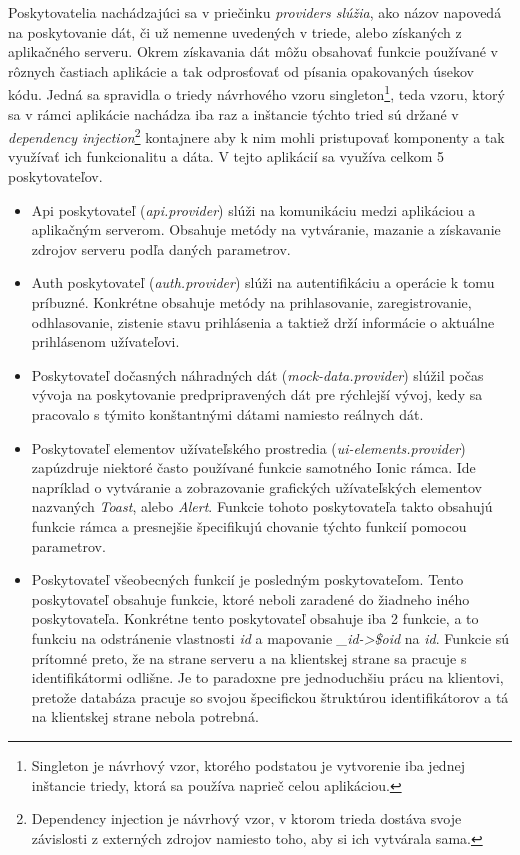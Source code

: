 Poskytovatelia nachádzajúci sa v priečinku \textit{providers slúžia}, ako názov napovedá na poskytovanie dát, či už nemenne uvedených v triede, alebo získaných z aplikačného serveru. Okrem získavania dát môžu obsahovať funkcie používané v rôznych častiach aplikácie a tak odprosťovať od písania opakovaných úsekov kódu. Jedná sa spravidla o triedy návrhového vzoru singleton\footnote{Singleton je návrhový vzor, ktorého podstatou je vytvorenie iba jednej inštancie triedy, ktorá sa používa naprieč celou aplikáciou.\cite{lREQ9U50PweZWx0G}}, teda vzoru, ktorý sa v rámci aplikácie nachádza iba raz a inštancie týchto tried sú držané v \textit{dependency injection}\footnote{Dependency injection je návrhový vzor, v ktorom trieda dostáva svoje závislosti z externých zdrojov namiesto toho, aby si ich vytvárala sama.\cite{huX3wRi17CwZ4WPd}} kontajnere aby k nim mohli pristupovať komponenty a tak využívať ich funkcionalitu a dáta. V tejto aplikácií sa využíva celkom 5 poskytovateľov. 
\begin{itemize}
\item Api poskytovateľ (\textit{api.provider}) slúži na komunikáciu medzi aplikáciou a aplikačným serverom. Obsahuje metódy na vytváranie, mazanie a získavanie zdrojov serveru podľa daných parametrov. 
\item Auth poskytovateľ (\textit{auth.provider}) slúži na autentifikáciu a operácie k tomu príbuzné. Konkrétne obsahuje metódy na prihlasovanie, zaregistrovanie, odhlasovanie, zistenie stavu prihlásenia a taktiež drží informácie o aktuálne prihlásenom užívateľovi. 
\item Poskytovateľ dočasných náhradných dát (\textit{mock-data.provider}) slúžil počas vývoja na poskytovanie predpripravených dát pre rýchlejší vývoj, kedy sa pracovalo s týmito konštantnými dátami namiesto reálnych dát. 
\item Poskytovateľ elementov užívateľského prostredia (\textit{ui-elements.provider}) zapúzdruje niektoré často používané funkcie samotného Ionic rámca. Ide napríklad o vytváranie a zobrazovanie grafických užívateľských elementov nazvaných \textit{Toast}, alebo \textit{Alert}. Funkcie tohoto poskytovateľa takto obsahujú funkcie rámca a presnejšie špecifikujú chovanie týchto funkcií pomocou parametrov. 
\item Poskytovateľ všeobecných funkcií je posledným poskytovateľom. Tento poskytovateľ obsahuje funkcie, ktoré neboli zaradené do žiadneho iného poskytovateľa. Konkrétne tento poskytovateľ obsahuje iba 2 funkcie, a to funkciu na odstránenie vlastnosti \textit{id} a mapovanie \textit{\_id->\$oid} na \textit{id}. Funkcie sú prítomné preto, že na strane serveru a na klientskej strane sa pracuje s identifikátormi odlišne. Je to paradoxne pre jednoduchšiu prácu na klientovi, pretože databáza pracuje so svojou špecifickou štruktúrou identifikátorov a tá na klientskej strane nebola potrebná.
\end{itemize}

